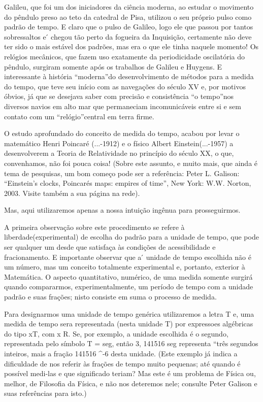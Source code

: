 Galileu, que foi um dos iniciadores da ciência moderna, ao estudar o movimento do pêndulo preso ao teto da catedral de Pisa, utilizou o seu próprio pulso como padrão de tempo. E claro que o pulso de Galileo, logo ele que passou por tantos sobressaltos e  ́ chegou tão perto da fogueira da Inquisição, certamente não deve ter sido o mais estável dos padrões, mas era o que ele tinha naquele momento! Os relógios mecânicos, que fazem uso exatamente da periodicidade oscilatória do pêndulo, surgiram somente após os trabalhos de Galileu e Huygens. E interessante à história “moderna”do desenvolvimento de métodos para a medida do tempo, que teve seu início com as navegações do século XV e, por motivos óbvios, já que se desejava saber com precisão e consistência “o tempo”nos diversos navios em alto mar que permaneciam incomunicáveis entre si e sem contato com um “relógio”central em terra firme.

O estudo aprofundado do conceito de medida do tempo, acabou por levar o matemático Henri Poincaré (...-1912) e o físico Albert Einstein(...-1957) a desenvolverem a Teoria de Relatividade no princípio do século XX, o que, convenhamos, não foi pouca coisa! (Sobre este assunto, e muito mais, que ainda é tema de pesquisas, um bom começo pode ser a referência: Peter L. Galison: “Einstein’s clocks, Poincarés maps: empires of time”, New York: W.W. Norton, 2003. Visite também a sua página na rede).

Mas, aqui utilizaremos apenas a nossa intuição ingênua para prosseguirmos.

A primeira observação sobre este procedimento se refere à liberdade(experimental) de escolha do padrão para a unidade de tempo, que pode ser qualquer um desde que satisfaça às condições de acessibilidade e fracionamento. E importante observar que a  ́ unidade de tempo escolhida não é um número, mas um conceito totalmente experimental e, portanto, exterior à Matemática. O aspecto quantitativo, numérico, de uma medida somente surgirá quando compararmos, experimentalmente, um período de tempo com a unidade padrão e suas frações; nisto consiste em suma o processo de medida.

Para designarmos uma unidade de tempo genérica utilizaremos a letra T e, uma medida de tempo sera representada (nesta unidade T) por expressoes algébricas do tipo xT, com x \in R. Se, por exemplo, a unidade escolhida é o segundo, representada pelo símbolo T = seg, então 3, 141516 seg representa “três segundos inteiros, mais a fração 141516 ^{-6} desta unidade. (Este exemplo já indica a dificuldade de nos referir às frações de tempo muito pequenas; até quando é possível medi-las e que significado teriam? Mas este é um problema de Física ou, melhor, de Filosofia da Física, e não nos deteremos nele; consulte Peter Galison e suas referências para isto.)

